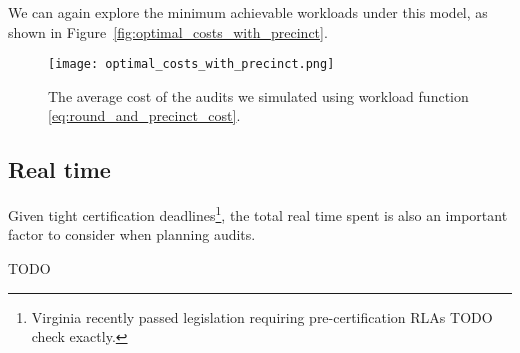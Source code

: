 We can again explore the minimum achievable workloads under this model, as shown in Figure~\ref{fig:optimal_costs_with_precinct}.

\begin{figure}
\texttt{[image: optimal\_costs\_with\_precinct.png]}
\caption{The average cost of the audits we simulated using workload function \ref{eq:round_and_precinct_cost}.}
\label{fig:optimal_ps}
\end{figure}


\subsection{Real time}
Given tight certification deadlines\footnote{Virginia recently passed legislation requiring pre-certification RLAs TODO check exactly.}, the total real time spent is also an important factor to consider when planning audits.

TODO





